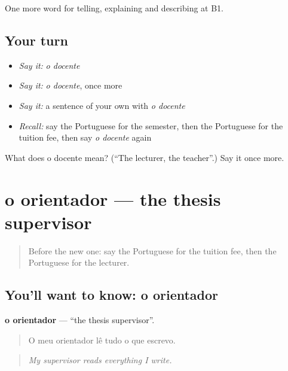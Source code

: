 \begin{grammarlens}[title={What you've built}]
One more word for telling, explaining and describing at B1.
\end{grammarlens}

\subsection*{Your turn}
\begin{itemize}
\raggedright
  \item \emph{Say it:} \emph{o docente}
  \item \emph{Say it:} \emph{o docente}, once more
  \item \emph{Say it:} a sentence of your own with \emph{o docente}
  \item \emph{Recall:} say the Portuguese for the semester, then the Portuguese for the tuition fee, then say \emph{o docente} again
\end{itemize}

\begin{tcolorbox}[breakable,colback=teal!4,colframe=teal!35!black,title={Before you move on}]
What does o docente mean? (\textquotedblleft{}The lecturer, the teacher\textquotedblright{}.) Say it once more.
\end{tcolorbox}
\section[o orientador]{o orientador — the thesis supervisor}

\label{lesson:PT-C377-orientador}



\begin{quote}
Before the new one: say the Portuguese for the tuition fee, then the Portuguese for the lecturer.
\end{quote}

\subsection*{You'll want to know: o orientador}
\textbf{o orientador} — \textquotedblleft{}the thesis supervisor\textquotedblright{}.

\begin{quote}
O meu orientador lê tudo o que escrevo.
\end{quote}

\begin{quote}
\emph{My supervisor reads everything I write.}
\end{quote}

